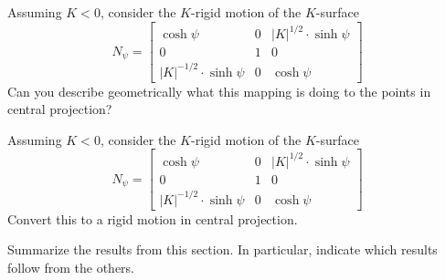 \documentclass{ximera}
\begin{document}
\begin{problem}
  Assuming $K < 0$, consider the $K$-rigid motion of the $K$-surface
  \[
  N_\psi=
  \begin{bmatrix}
    \cosh\psi & 0 & |K|^{1/2}\cdot\sinh\psi\\
    0 & 1 & 0\\
    |K|^{-1/2}\cdot\sinh\psi & 0 & \cosh\psi
  \end{bmatrix}
  \]
  Can you describe geometrically what this mapping is doing to the
  points in central projection?
\end{problem}

  
\begin{problem}
  Assuming $K < 0$, consider the $K$-rigid motion of the $K$-surface
  \[
  N_\psi=
  \begin{bmatrix}
    \cosh\psi & 0 & |K|^{1/2}\cdot\sinh\psi\\
    0 & 1 & 0\\
    |K|^{-1/2}\cdot\sinh\psi & 0 & \cosh\psi
  \end{bmatrix}
  \]
  Convert this to a rigid motion in central projection.
\end{problem}


\begin{problem}
Summarize the results from this section. In particular, indicate which
results follow from the others.
\begin{freeResponse}
\end{freeResponse}
\end{problem}
\end{document}

